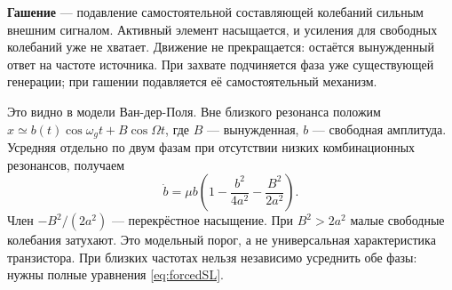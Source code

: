 \textbf{Гашение} --- подавление самостоятельной составляющей колебаний сильным внешним сигналом. Активный элемент насыщается, и усиления для свободных колебаний уже не хватает. Движение не прекращается: остаётся вынужденный ответ на частоте источника. При захвате подчиняется фаза уже существующей генерации; при гашении подавляется её самостоятельный механизм.

Это видно в модели Ван-дер-Поля. Вне близкого резонанса положим $x\simeq b(t)\cos\omega_gt+B\cos\Omega t$, где $B$ --- вынужденная, $b$ --- свободная амплитуда. Усредняя отдельно по двум фазам при отсутствии низких комбинационных резонансов, получаем
\begin{equation}\label{eq:quenching}
 \dot b=\mu b\left(1-\frac{b^2}{4a^2}-\frac{B^2}{2a^2}\right).
\end{equation}
Член $-B^2/(2a^2)$ --- перекрёстное насыщение. При $B^2>2a^2$ малые свободные колебания затухают. Это модельный порог, а не универсальная характеристика транзистора. При близких частотах нельзя независимо усреднить обе фазы: нужны полные уравнения \eqref{eq:forcedSL}.
